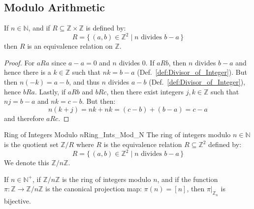 \documentclass{article}                                                        %
\begin{document}
        \subsection{Modulo Arithmetic}
            \begin{theorem}
                \label{thm:Modulo_n_is_Equiv_Relation}%
                If $n\in\mathbb{N}$, and if
                $R\subseteq\mathbb{Z}\times\mathbb{Z}$ is defined by:
                \begin{equation}
                    R=\{\,(a,b)\in\mathbb{Z}^{2}\;|\;
                        n\textrm{ divides }b-a\,\}
                \end{equation}
                then $R$ is an equivalence relation on $\mathbb{Z}$.
            \end{theorem}
            \begin{proof}
                For $aRa$ since $a-a=0$ and $n$ divides 0. If $aRb$, then $n$
                divides $b-a$ and hence there is a $k\in\mathbb{Z}$ such that
                $nk=b-a$ (Def.~\ref{def:Divisor_of_Integer}). But then
                $n(\minus{k})=a-b$, and thus $n$ divides $a-b$
                (Def.~\ref{def:Divisor_of_Integer}), hence $bRa$. Lastly, if
                $aRb$ and $bRc$, then there exist integers $j,k\in\mathbb{Z}$
                such that $nj=b-a$ and $nk=c-b$. But then:
                \begin{equation}
                    n(k+j)=nk+nk=(c-b)+(b-a)=c-a
                \end{equation}
                and therefore $aRc$.
            \end{proof}
            \begin{fdefinition}{Ring of Integers Modulo $n$}{Ring_Ints_Mod_N}
                The ring of integers modulo $n\in\mathbb{N}$ is the quotient set
                $\mathbb{Z}/R$ where $R$ is the equivalence relation
                $R\subseteq\mathbb{Z}^{2}$ defined by:
                \begin{equation*}
                    R=\{\,(a,b)\in\mathbb{Z}^{2}\;|\;n\textrm{ divides }b-a\,\}
                \end{equation*}
                We denote this $\mathbb{Z}/n\mathbb{Z}$.
            \end{fdefinition}
            \begin{theorem}
                \label{thm:Z_n_is_Bij_onto_Z_mod_n}%
                If $n\in\mathbb{N}^{+}$, if $\mathbb{Z}/n\mathbb{Z}$ is the ring
                of integers modulo $n$, and if the function
                $\pi:\mathbb{Z}\rightarrow\mathbb{Z}/n\mathbb{Z}$ is the
                canonical projection map: $\pi(n)=[n]$, then
                $\pi|_{\mathbb{Z}_{n}}$ is bijective.
            \end{theorem}
\end{document}

